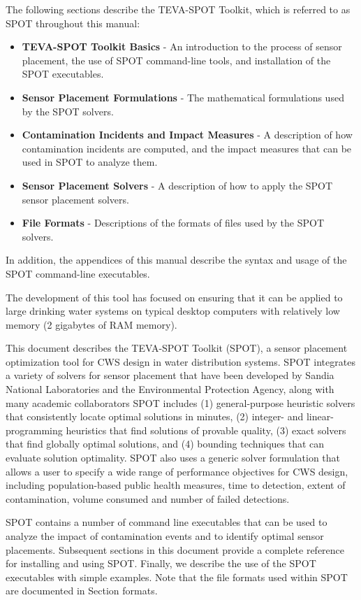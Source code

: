 The following sections describe the TEVA-\/SPOT Toolkit, which is referred to as SPOT throughout this manual: 
\begin{itemize}
\item {\bfseries TEVA-\/SPOT Toolkit Basics} -\/ An introduction to the process of sensor placement, the use of SPOT command-\/line tools, and installation of the SPOT executables. 
\item {\bfseries Sensor Placement Formulations} -\/ The mathematical formulations used by the SPOT solvers. 
\item {\bfseries Contamination Incidents and Impact Measures} -\/ A description of how contamination incidents are computed, and the impact measures that can be used in SPOT to analyze them.


\item {\bfseries Sensor Placement Solvers} -\/ A description of how to apply the SPOT sensor placement solvers. 
\item {\bfseries File Formats} -\/ Descriptions of the formats of files used by the SPOT solvers. 
\end{itemize}In addition, the appendices of this manual describe the syntax and usage of the SPOT command-\/line executables.

 

The development of this tool has focused on
ensuring that it can be applied to large drinking water systems on typical
desktop computers with relatively low memory (2 gigabytes of RAM memory).


This document describes the TEVA-SPOT Toolkit (SPOT), a sensor placement
optimization tool for CWS design in water distribution systems. SPOT
integrates a variety of solvers for sensor placement that have been
developed by Sandia National Laboratories and the Environmental
Protection Agency, along with many academic collaborators\latexonly
\cite{MurUbeJan06,MurBerHar06,CarGreHarKonLauLinMorPhi06,HarBerMurPhiRieWat07,BerHarPhiUbeWat06,BerFleHarPhiWat05}
SPOT includes (1) general-purpose heuristic solvers that consistently
locate optimal solutions in minutes, (2) integer- and linear-programming
heuristics that find solutions of provable quality, (3) exact solvers
that find globally optimal solutions, and (4) bounding techniques that can
evaluate solution optimality. SPOT also uses a generic solver formulation
that allows a user to specify a wide range of performance objectives
for CWS design, including population-based public health measures,
time to detection, extent of contamination, volume consumed and number
of failed detections.

SPOT contains a number of command line executables that can be used to
analyze the impact of contamination events and to identify optimal sensor
placements. Subsequent sections in this document provide a complete
reference for installing and using SPOT. Finally, we describe the use
of the SPOT executables with simple examples.  Note that the file
formats used within SPOT are documented
in Section formats.

\fi
 
